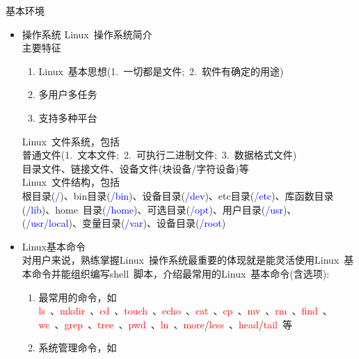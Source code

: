 \documentclass{article}      %
\begin{document}
基本环境
\begin{itemize}
	\item 操作系统 \textrm{Linux~}操作系统简介\\
		主要特征
		\begin{enumerate}
			\item \textrm{Linux~}基本思想(1.~一切都是文件;~2.~软件有确定的用途)
			\item 多用户多任务
			\item 支持多种平台
		\end{enumerate}
		\textrm{Linux~}文件系统，包括\\
		普通文件(1.~文本文件;~2.~可执行二进制文件;~3.~数据格式文件)\\
		目录文件、链接文件、设备文件(块设备/字符设备)等\\
		\textrm{Linux~}文件结构，包括\\
		根目录(\textcolor{blue}{/})、\textrm{bin}目录(\textcolor{blue}{/\textrm{bin}})、设备目录(\textcolor{blue}{/\textrm{dev}})、\textrm{etc}目录(\textcolor{blue}{/\textrm{etc}})、库函数目录(\textcolor{blue}{/\textrm{lib}})、\textrm{home~}目录(\textcolor{blue}{/\textrm{home}})、可选目录(\textcolor{blue}{/\textrm{opt}})、用户目录(\textcolor{blue}{/\textrm{usr}})、(\textcolor{blue}{/\textrm{usr}/\textrm{local}})、变量目录(\textcolor{blue}{/\textrm{var}})、设备目录(\textcolor{blue}{/\textrm{root}})
	\item Linux基本命令\\
		对用户来说，熟练掌握\textrm{Linux~}操作系统最重要的体现就是能灵活使用\textrm{Linux~}基本命令并能组织编写\textrm{shell~}脚本，介绍最常用的\textrm{Linux~}基本命令(含选项):\\
		\begin{enumerate}
			\item 最常用的命令，如\\
				\textcolor{red}{\textrm{ls~}}、\textcolor{red}{\textrm{mkdir~}}、\textcolor{red}{\textrm{cd~}}、\textcolor{red}{\textrm{touch~}}、\textcolor{red}{\textrm{echo~}}、\textcolor{red}{\textrm{cat~}}、\textcolor{red}{\textrm{cp~}}、\textcolor{red}{\textrm{mv~}}、\textcolor{red}{\textrm{rm~}}、\textcolor{red}{\textrm{find~}}、\textcolor{red}{\textrm{wc~}}、\textcolor{red}{\textrm{grep~}}、\textcolor{red}{\textrm{tree~}}、\textcolor{red}{\textrm{pwd~}}、\textcolor{red}{\textrm{ln~}}、\textcolor{red}{\textrm{more}}/\textcolor{red}{\textrm{less~}}、\textcolor{red}{\textrm{head}}/\textcolor{red}{\textrm{tail~}}等
			\item 系统管理命令，如\\

\end{enumerate}
\end{itemize}
\end{document}
